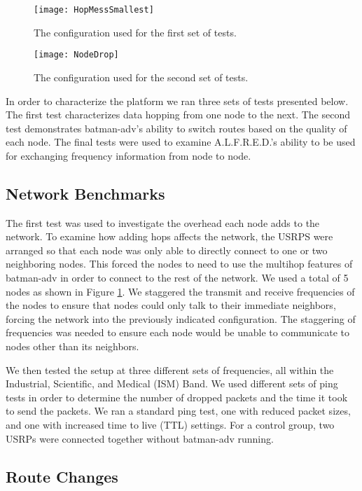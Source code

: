 \begin{figure}
	\centering
	\texttt{[image: HopMessSmallest]}
	\caption{The configuration used for the first set of tests.}
	\label{fig:HopMess}
\end{figure}

\begin{figure}
	\centering
	\texttt{[image: NodeDrop]}
	\caption{The configuration used for the second set of tests.}
	\label{fig:NodeDrop}
\end{figure}

In order to characterize the platform we ran three sets of tests presented below. The first test characterizes data hopping from one node to the next. The second test demonstrates batman-adv's ability to switch routes based on the quality of each node. The final tests were used to examine A.L.F.R.E.D.'s ability to be used for exchanging frequency information from node to node. 

\subsection{Network Benchmarks}

The first test was used to investigate the overhead each node adds to the network. To examine how adding hops affects the network, the USRPS were arranged so that each node was only able to directly connect to one or two neighboring nodes. This forced the nodes to need to use the multihop features of batman-adv in order to connect to the rest of the network. We used a total of 5 nodes as shown in Figure \ref{fig:HopMess}. We staggered the transmit and receive frequencies of the nodes to ensure that nodes could only talk to their immediate neighbors, forcing the network into the previously indicated configuration. The staggering of frequencies was needed to ensure each node would be unable to communicate to nodes other than its neighbors. 

 We then tested the setup at three different sets of frequencies, all within the Industrial, Scientific, and Medical (ISM) Band. We used different sets of ping tests in order to determine the number of dropped packets and the time it took to send the packets. We ran a standard ping test, one with reduced packet sizes, and one with increased time to live (TTL) settings. For a control group, two USRPs were connected together without batman-adv running. 


\subsection{Route Changes}

